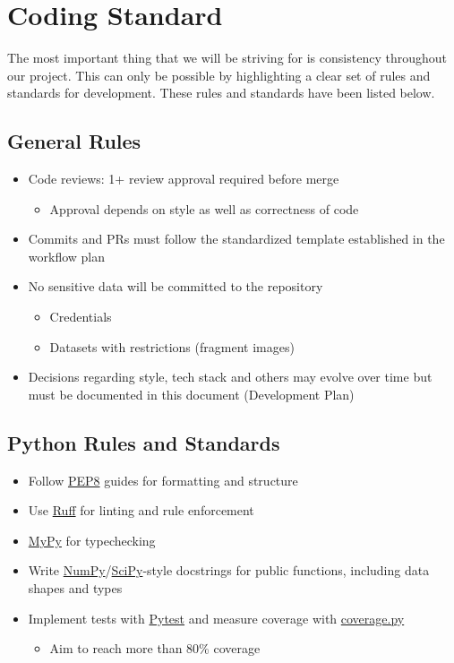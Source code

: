 \documentclass{article}
\begin{document}
\section{Coding Standard}

\noindent The most important thing that we will be striving for is consistency throughout our project. This can only be possible by highlighting a clear set of rules and standards for development. These rules and standards have been listed below.

\subsection*{General Rules}
\begin{itemize}
    \item Code reviews: 1+ review approval required before merge
    \begin{itemize}
        \item Approval depends on style as well as correctness of code
    \end{itemize}
    \item Commits and PRs must follow the standardized template established in the workflow plan
    \item No sensitive data will be committed to the repository
    \begin{itemize}
        \item Credentials
        \item Datasets with restrictions (fragment images)
    \end{itemize}
    \item Decisions regarding style, tech stack and others may evolve over time but must be documented in this document (Development Plan)
\end{itemize}

\subsection*{Python Rules and Standards}
\begin{itemize}
    \item Follow \href{https://pep8.org/}{PEP8} guides for formatting and structure
    \item Use \href{https://docs.astral.sh/ruff/}{Ruff} for linting and rule enforcement
    \item \href{https://mypy.readthedocs.io/}{MyPy} for typechecking
    \item Write \href{https://numpy.org/doc/stable/dev/howto-docs.html}{NumPy}/\href{https://docs.scipy.org/doc/scipy/dev/contributor/adding_new.html}{SciPy}-style docstrings for public functions, including data shapes and types
    \item Implement tests with \href{https://pytest.org/}{Pytest} and measure coverage with \href{https://coverage.readthedocs.io/}{coverage.py}
    \begin{itemize}
        \item Aim to reach more than 80\% coverage
    \end{itemize}
\end{itemize}
\end{document}
